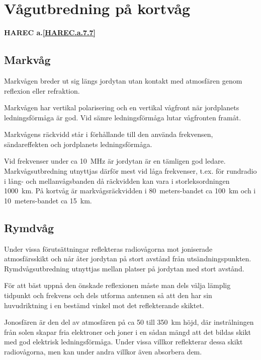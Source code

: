 \section{Vågutbredning på kortvåg}
\textbf{
HAREC a.\ref{HAREC.a.7.7}\label{myHAREC.a.7.7}
}

\subsection{Markvåg}

Markvågen breder ut sig längs jordytan utan kontakt med atmosfären
genom reflexion eller refraktion.

Markvågen har vertikal polarisering och en vertikal vågfront när
jordplanets ledningsförmåga är god. Vid sämre ledningsförmåga lutar
vågfronten framåt.

Markvågens räckvidd står i förhållande till den använda frekvensen,
sändareffekten och jordplanets ledningsförmåga.

Vid frekvenser under ca 10~MHz är jordytan är en tämligen god
ledare. Markvågsutbredning utnyttjas därför mest vid låga frekvenser,
t.ex. för rundradio i lång- och mellanvågsbanden då räckvidden kan
vara i storleksordningen 1000~km.
På kortvåg är markvågsräckvidden i 80~meters-bandet ca 100~km och i
10~meters-bandet ca 15~km.

\subsection{Rymdvåg}

Under vissa förutsättningar reflekteras radiovågorna mot joniserade
atmosfärsskikt och når åter jordytan på stort avstånd från
utsändningspunkten. Rymdvågsutbredning utnyttjas mellan platser på
jordytan med stort avstånd.

För att bäst uppnå den önskade reflexionen måste man dels välja
lämplig tidpunkt och frekvens och dels utforma antennen så att den har
sin huvudriktning i en bestämd vinkel mot det reflekterande skiktet.

Jonosfären är den del av atmosfären på ca 50 till 350~km höjd, där
instrålningen från solen skapar fria elektroner och joner i en sådan
mängd att det bildas skikt med god elektrisk ledningsförmåga. Under
vissa villkor reflekterar dessa skikt radiovågorna, men kan under
andra villkor även absorbera dem.

